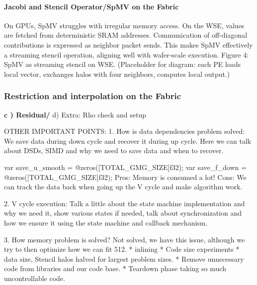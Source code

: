 \documentclass[sigconf]{acmart}
\begin{document}
    \paragraph{Jacobi and Stencil Operator/SpMV on the Fabric}
    On GPUs, SpMV struggles with irregular memory access. On the WSE, values are fetched from deterministic SRAM addresses. Communication of off-diagonal contributions is expressed as neighbor packet sends. This makes SpMV effectively a streaming stencil operation, aligning well with wafer-scale execution.
    Figure 4: SpMV as streaming stencil on WSE.
    (Placeholder for diagram: each PE loads local vector, exchanges halos with four neighbors, computes local output.)

\subsubsection{Restriction and interpolation on the Fabric}

    \textbf{c ) Residual/}
    d) Extra: Rho check and setup

    OTHER IMPORTANT POINTS:
    1. How is data dependencies problem solved: 
        We save data during down cycle and recover it during up cycle. Here we can talk about DSDs, SIMD and why we need to save data and when to recover. 
        
        
        

        var save\_u\_smooth = @zeros([TOTAL\_GMG\_SIZE]f32);
        var save\_f\_down = @zeros([TOTAL\_GMG\_SIZE]f32);
        Pros: Memory is consumed a lot!
        Cons: We can track the data back when going up the V cycle and make algorithm work. 
        

    2. V cycle execution:
        Talk a little about the state machine implementation and why we need it, show various states if needed, talk about synchronization and how we ensure it using the state machine and callback mechanism.
        
    3. How memory problem is solved? Not solved, we have this issue, although we try to then optimize how we can fit 512. 
            * inlining
            * Code size experiments
            * data size, Stencil halos halved for largest problem sizes.
            * Remove unnecessary code from libraries and our code base. 
            * Teardown phase taking so much uncontrollable code. 
\end{document}
